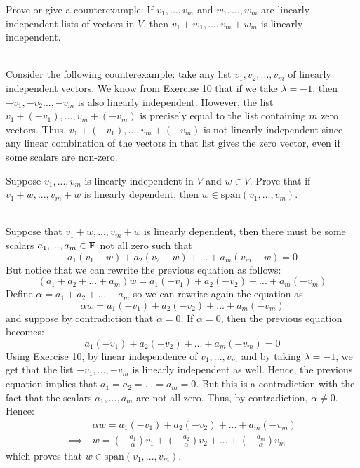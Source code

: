 \begin{exercise}
    Prove or give a counterexample: If $v_1, ..., v_m$ and  $w_1, ..., w_m$ are linearly independent lists of vectors in $V$, then  $v_1+w_1, ..., v_m + w_m$ is linearly independent. \\
\end{exercise}

\begin{solution}
    \\ Consider the following counterexample: take any list $v_1, v_2, ..., v_m$ of linearly independent vectors. We know from Exercise 10 that if we take $\lambda = -1$, then $-v_1,-v_2 ..., -v_m$ is also linearly independent. However, the list $v_1+(-v_1), ..., v_m + (-v_m)$ is precisely equal to the list containing $m$ zero vectors. Thus, $v_1+(-v_1), ..., v_m + (-v_m)$ is not linearly independent since any linear combination of the vectors in that list gives the zero vector, even if some scalars are non-zero. \\
\end{solution}

\begin{exercise}
    Suppose $v_1, ..., v_m$ is linearly independent in $V$ and $w \in V$. Prove that if $v_1 + w, ..., v_m + w$ is linearly dependent, then $w \in \text{span}(v_1, ..., v_m)$. \\
\end{exercise}

\begin{solution}
    \\ Suppose that $v_1 + w, ..., v_m + w$ is linearly dependent, then there must be some scalars $a_1, ..., a_m \in \mathbf{F}$ not all zero such that
    $$a_1(v_1 + w) + a_2(v_2 + w) + ... + a_m(v_m + w)=0$$
    But notice that we can rewrite the previous equation as follows:
    $$(a_1 + a_2 + ... + a_m) w = a_1(-v_1) + a_2(-v_2) + ... + a_m(-v_m)$$
    Define $\alpha = a_1 + a_2 + ... + a_m$ so we can rewrite again the equation as
    $$\alpha w = a_1(-v_1) + a_2(-v_2) + ... + a_m(-v_m)$$ 
    and suppose by contradiction that $\alpha = 0$. If $\alpha=0$, then the previous equation becomes:
    $$a_1(-v_1) + a_2(-v_2) + ... + a_m(-v_m) = 0$$
    Using Exercise 10, by linear independence of $v_1, ..., v_m$ and by taking $\lambda = -1$, we get that the list $-v_1, ...,-v_m$ is linearly independent as well. Hence, the previous equation implies that $a_1 = a_2 = ... = a_m = 0$. But this is a contradiction with the fact that the scalars $a_1, ..., a_m$ are not all zero. Thus, by contradiction, $\alpha \neq 0$. Hence:
    \begin{align*}
        & \alpha w = a_1(-v_1) + a_2(-v_2) + ... + a_m(-v_m) \\
        \implies \ & w = \left(-\frac{a_1}{\alpha}\right)v_1 + \left(-\frac{a_2}{\alpha}\right)v_2 + ... + \left(-\frac{a_m}{\alpha}\right)v_m
    \end{align*}
    which proves that $w \in \text{span}(v_1, ..., v_m)$. \\
\end{solution}

